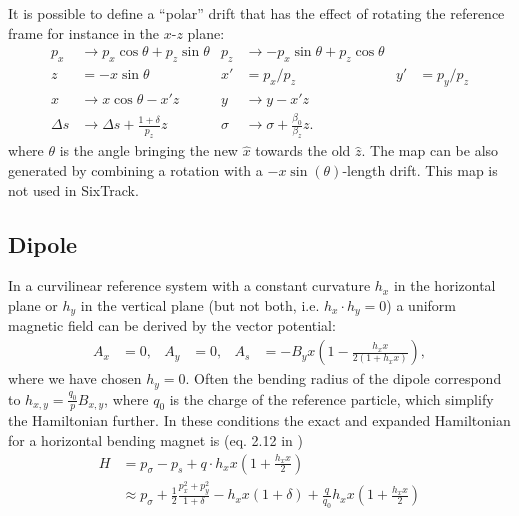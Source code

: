 \documentclass[english]{article}
\begin{document}
It is possible to define a ``polar'' drift that has the effect of rotating the reference frame
\cite{forest99} for instance in the $x$-$z$ plane:
\begin{align}
p_x & \to   p_x \cos \theta + p_z \sin\theta &
p_z & \to - p_x \sin \theta + p_z \cos\theta \\
z   &= -x \sin \theta & x' &= p_x/p_z &  y' &= p_y/p_z \\
x   & \to x \cos\theta - x' z  &
y   & \to y - x' z  \\
\Delta s & \to \Delta s +\frac{1+\delta}{p_z} z &
\sigma & \to \sigma + \frac{\beta_0}{\beta_z}   z.
\end{align}
where $\theta$ is the angle bringing the new $\hat x$ towards the old $\hat z$.
The map can be also generated by combining a rotation with a $-x
\sin(\theta)$-length drift. This map is not used in SixTrack.


\subsection{Dipole}
In a curvilinear reference system with a constant curvature $h_x$ in the
horizontal plane or $h_y$ in the vertical plane (but not both, i.e. $h_x \cdot h_y=0$)
a uniform magnetic field can be derived by the vector potential:
\begin{align}
  A_x & = 0, & A_y & = 0, & A_s & = 
  - B_y x\left(1-\frac{h_xx}{2(1+h_xx)}\right),
\end{align}
where we have chosen $h_y=0$. Often the bending radius of the dipole correspond to 
$h_{x,y}=\frac{q_0}{p} B_{x,y}$, where $q_0$ is the charge of the reference particle, 
which simplify the Hamiltonian further. In these conditions the exact and
expanded Hamiltonian for a horizontal bending magnet is (eq. 2.12 in
\cite{barber87})
\begin{align}
  H &= p_\sigma - p_s + q\cdot h_xx \left(1+\frac{h_xx}{2}\right) \\
    &\approx p_\sigma + \frac{1}{2}\frac{p_x^2+p_y^2}{1+\delta}
  - h_xx(1+\delta) + \frac{q}{q_0} h_xx \left(1+\frac{h_xx}{2}\right)
\end{align}
\end{document}
